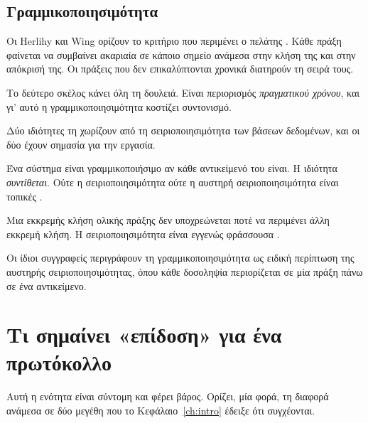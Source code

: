 \subsection{Γραμμικοποιησιμότητα}

Οι Herlihy και Wing ορίζουν το κριτήριο που περιμένει ο πελάτης
\cite{herlihy1990linearizability}. Κάθε πράξη φαίνεται να συμβαίνει
ακαριαία σε κάποιο σημείο ανάμεσα στην κλήση της και στην απόκρισή της.
Οι πράξεις που δεν επικαλύπτονται χρονικά διατηρούν τη σειρά τους.

Το δεύτερο σκέλος κάνει όλη τη δουλειά. Είναι περιορισμός
\emph{πραγματικού χρόνου}, και γι' αυτό η γραμμικοποιησιμότητα κοστίζει
συντονισμό.

Δύο ιδιότητες τη χωρίζουν από τη σειριοποιησιμότητα των βάσεων
δεδομένων, και οι δύο έχουν σημασία για την εργασία.

\begin{description}[leftmargin=2.2em,style=nextline,font=\normalfont\bfseries]
  \item[Τοπικότητα (\en{locality}).] Ένα σύστημα είναι γραμμικοποιήσιμο
  αν κάθε αντικείμενό του είναι. Η ιδιότητα \emph{συντίθεται}. Ούτε η
  σειριοποιησιμότητα ούτε η αυστηρή σειριοποιησιμότητα είναι τοπικές
  \cite{herlihy1990linearizability}.
  \item[Μη φραγή (\en{nonblocking}).] Μια εκκρεμής κλήση ολικής πράξης
  δεν υποχρεώνεται ποτέ να περιμένει άλλη εκκρεμή κλήση. Η
  σειριοποιησιμότητα είναι εγγενώς φράσσουσα
  \cite{herlihy1990linearizability}.
\end{description}

Οι ίδιοι συγγραφείς περιγράφουν τη γραμμικοποιησιμότητα ως ειδική
περίπτωση της αυστηρής σειριοποιησιμότητας, όπου κάθε δοσοληψία
περιορίζεται σε μία πράξη πάνω σε ένα αντικείμενο.

\section{Τι σημαίνει «επίδοση» για ένα πρωτόκολλο}
\label{sec:performance}

Αυτή η ενότητα είναι σύντομη και φέρει βάρος. Ορίζει, μία φορά, τη
διαφορά ανάμεσα σε δύο μεγέθη που το Κεφάλαιο~\ref{ch:intro} έδειξε ότι
συγχέονται.

